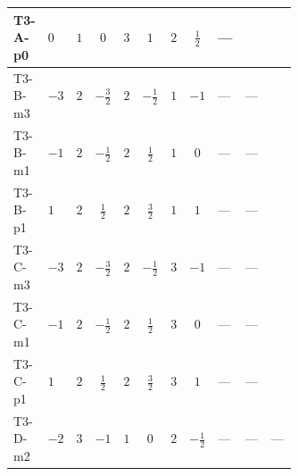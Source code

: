 \documentclass[8pt]{article}
\begin{document}
\begin{landscape}
\begin{longtable}{@{}llcccccc >{\raggedright\arraybackslash}p{0.21\linewidth} >{\raggedright\arraybackslash}p{0.21\linewidth} >{\raggedright\arraybackslash}p{0.21\linewidth}@{}}
\midrule
T3-A-p0 & $0$ & $1$ & $0$ & $3$ & $1$ & $2$ & $\frac{1}{2}$ & --- & \scriptsize\adjustbox{max width=\linewidth}{$\begin{gathered} -\frac{33 {g_2}^2 {\lambda_{HS_2}^{(A)}}}{2}\end{gathered}$} & \scriptsize\adjustbox{max width=\linewidth}{$\begin{gathered} +2 {\lambda_1} {\lambda_{HS_2}^{(A)}}\end{gathered}$} \\
\midrule
T3-B-m3 & $-3$ & $2$ & $-\frac{3}{2}$ & $2$ & $-\frac{1}{2}$ & $1$ & $-1$ & --- & --- & \scriptsize\adjustbox{max width=\linewidth}{$\begin{gathered} +2 {\lambda_1} {\lambda_{HS_2}^{(A)}}\end{gathered}$} \\
\midrule
T3-B-m1 & $-1$ & $2$ & $-\frac{1}{2}$ & $2$ & $\frac{1}{2}$ & $1$ & $0$ & --- & --- & \scriptsize\adjustbox{max width=\linewidth}{$\begin{gathered} +2 {\lambda_1} {\lambda_{HS_2}^{(A)}}\end{gathered}$} \\
\midrule
T3-B-p1 & $1$ & $2$ & $\frac{1}{2}$ & $2$ & $\frac{3}{2}$ & $1$ & $1$ & --- & --- & \scriptsize\adjustbox{max width=\linewidth}{$\begin{gathered} +2 {\lambda_1} {\lambda_{HS_2}^{(A)}}\end{gathered}$} \\
\midrule
T3-C-m3 & $-3$ & $2$ & $-\frac{3}{2}$ & $2$ & $-\frac{1}{2}$ & $3$ & $-1$ & --- & --- & \scriptsize\adjustbox{max width=\linewidth}{$\begin{gathered} +2 {\lambda_1} {\lambda_{HS_2}^{(A)}}\end{gathered}$} \\
\midrule
T3-C-m1 & $-1$ & $2$ & $-\frac{1}{2}$ & $2$ & $\frac{1}{2}$ & $3$ & $0$ & --- & --- & \scriptsize\adjustbox{max width=\linewidth}{$\begin{gathered} +2 {\lambda_1} {\lambda_{HS_2}^{(A)}}\end{gathered}$} \\
\midrule
T3-C-p1 & $1$ & $2$ & $\frac{1}{2}$ & $2$ & $\frac{3}{2}$ & $3$ & $1$ & --- & --- & \scriptsize\adjustbox{max width=\linewidth}{$\begin{gathered} +2 {\lambda_1} {\lambda_{HS_2}^{(A)}}\end{gathered}$} \\
\midrule
T3-D-m2 & $-2$ & $3$ & $-1$ & $1$ & $0$ & $2$ & $-\frac{1}{2}$ & --- & --- & --- \\

\end{longtable}
\end{landscape}
\end{document}
